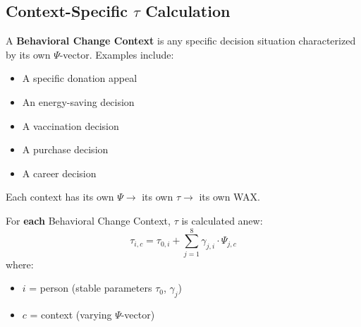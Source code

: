 \subsection{Context-Specific $\tau$ Calculation}
\label{sec:tau-per-context}

\begin{definition}
\label{def:bc-context}
A \textbf{Behavioral Change Context} is any specific decision situation characterized by its own $\Psi$-vector. Examples include:
\begin{itemize}
\item A specific donation appeal
\item An energy-saving decision
\item A vaccination decision
\item A purchase decision
\item A career decision
\end{itemize}
Each context has its own $\Psi \rightarrow$ its own $\tau \rightarrow$ its own WAX.
\end{definition}

\begin{definition}
\label{def:tau-per-context}
For \textbf{each} Behavioral Change Context, $\tau$ is calculated anew:
\begin{equation}
\tau_{i,c} = \tau_{0,i} + \sum_{j=1}^{8} \gamma_{j,i} \cdot \Psi_{j,c}
\end{equation}
where:
\begin{itemize}
\item $i$ = person (stable parameters $\tau_0$, $\gamma_j$)
\item $c$ = context (varying $\Psi$-vector)
\end{itemize}
\end{definition}

